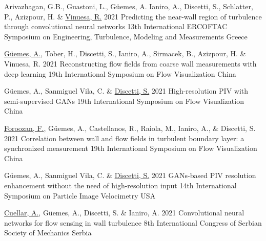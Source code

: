 \begin{conferences}
  \conferenceitem%
    {Arivazhagan, G.B., Guastoni, L., Güemes, A. Ianiro, A., Discetti, S., Schlatter, P., Azizpour, H. \& \underline{Vinuesa, R.}}%
    {2021}%
    {Predicting the near-wall region of turbulence through convolutional neural networks}%
    {13th International ERCOFTAC Symposium on Engineering, Turbulence, Modeling and Measurements}%
    {Greece}%

	\conferenceitem%
    {\underline{Güemes, A.}, Tober, H., Discetti, S., Ianiro, A., Sirmacek, B., Azizpour, H. \& Vinuesa, R.}%
    {2021}%
    {Reconstructing flow fields from coarse wall measurements with deep learning}%
    {19th International Symposium on Flow Visualization}%
    {China}%

	\conferenceitem%
		{Güemes, A., Sanmiguel Vila, C. \& \underline{Discetti, S.}}%
		{2021}%
		{High-resolution PIV with semi-supervised GANs}%
		{19th International Symposium on Flow Visualization}%
		{China}%

	\conferenceitem%
		{\underline{Foroozan, F.}, Güemes, A., Castellanos, R., Raiola, M., Ianiro, A., \& Discetti, S.}%
		{2021}%
		{Correlation between wall and flow fields in turbulent boundary layer: a synchronized measurement}%
		{19th International Symposium on Flow Visualization}%
		{China}%

	\conferenceitem%
		{Güemes, A., Sanmiguel Vila, C. \& \underline{Discetti, S.}}%
		{2021}%
		{GANs-based PIV resolution enhancement without the need of high-resolution input}%
		{14th International Symposium on Particle Image Velocimetry}%
		{USA}%

	\conferenceitem%
		{\underline{Cuellar, A.}, Güemes, A., Discetti, S. \& Ianiro, A.}%
		{2021}%
		{Convolutional neural networks for flow sensing in wall turbulence}%
		{8th International Congress of Serbian Society of Mechanics}%
		{Serbia}%

\end{conferences}


%
\tableofcontents
